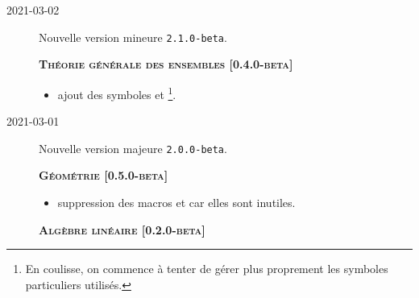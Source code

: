 \documentclass[12pt,a4paper]{book}
\begin{document}
\begin{description}
    
    \separation


    \medskip
    \item[2021-03-02] Nouvelle version mineure \verb+2.1.0-beta+.
    
    
    
    
    \begin{center}
        \textbf{\textsc{Théorie générale des ensembles [0.4.0-beta]}}
    \end{center}
    
    \begin{itemize}[itemsep=.5em]
        \item {}
              ajout des symboles  et  
              \footnote{
              	En coulisse, on commence à tenter de gérer plus proprement les symboles particuliers utilisés.
    		  }.
    \end{itemize}
    
    
    \separation


    \medskip
    \item[2021-03-01] Nouvelle version majeure \verb+2.0.0-beta+.
    
    
    
    
    \begin{center}
        \textbf{\textsc{Géométrie [0.5.0-beta]}}
    \end{center}
    
    \begin{itemize}[itemsep=.5em]
        \item {}
              suppression des macros  et  car elles sont inutiles.
    
    
    \end{itemize}
    
    
    \separation
    
    
    
    
    \begin{center}
        \textbf{\textsc{Algèbre linéaire [0.2.0-beta]}}
    \end{center}
    

\end{description}
\end{document}
